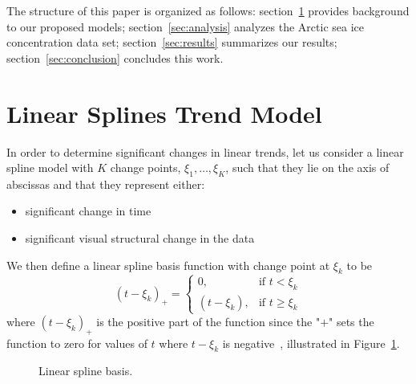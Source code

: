 \documentclass[12pt]{article}
\begin{document}
The structure of this paper is organized as follows: section~\ref{sec:splines} provides background to our proposed models; section~\ref{sec:analysis} analyzes the Arctic sea ice concentration data set; section~\ref{sec:results} summarizes our results; section~\ref{sec:conclusion} concludes this work.


\section{Linear Splines Trend Model} \label{sec:splines}

In order to determine significant changes in linear trends, let us consider a linear spline model with $K$ change points, $\xi_1,\dots,\xi_K$, such that they lie on the axis of abscissas and that they represent either:
  \begin{itemize}
    \item significant change in time
    \item significant visual structural change in the data
  \end{itemize}
We then define a linear spline basis function with change point at $\xi_k$ to be
  \begin{equation*}
    (t-\xi_{k})_{+} =
      \begin{cases}
      0,           & \text{if $t < \xi_{k}$} \\
      (t-\xi_{k}), & \text{if $t \geq \xi_{k}$}
      \end{cases}
  \end{equation*}
where $(t-\xi_k)_{+}$ is the positive part of the function since the "$+$" sets the function to zero for values of $t$ where $t-\xi_{k}$ is negative~\citep{ruppert}, illustrated in Figure~\ref{spline}. 
\begin{figure}[!h]
  \centering
  \caption{Linear spline basis.} \label{spline}
\end{figure}
\end{document}

